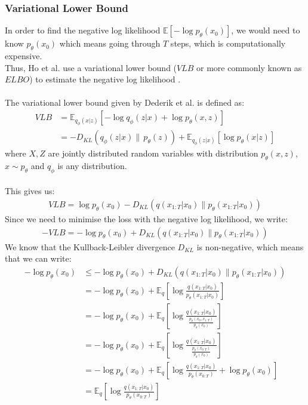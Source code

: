 \documentclass[twoside]{article}
\numberwithin{equation}{section}
\numberwithin{figure}{section}
\begin{document}
\subsubsection{Variational Lower Bound}
In order to find the negative log likelihood $\mathbb{E}\left[- \log p_{\theta} \left(x_0\right)\right]$, we would need to know $p_{\theta} (x_0)$ which means going through $T$ steps, which is computationally expensive. \\
Thus, Ho et al. \cite{ho2020denoising} use a variational lower bound ($VLB$ or more commonly known as $ELBO$) to estimate the negative log likelihood \cite{ho2020denoising,sohldickstein2015deep}.
\\\\
The variational lower bound given by Dederik et al. is defined as: \cite{kingma2022autoencoding} 
\begin{align}
  VLB &= \mathbb{E}_{q_\phi (x | z)} \left[ - \log q_\phi (z | x) + \log p_\theta(x, z) \right] \\[10pt]
  &= - D_{KL} (q_\phi (z | x) \| \, p_\theta (z)) + \mathbb{E}_{q_\phi (z | x)} \left[ \log p_\theta (x | z) \right]
\end{align}
where $X, Z$ are jointly distributed random variables with distribution $p_\theta (x, z)$, $x \sim p_\theta$ and $q_\phi$ is any distribution.
\\\\
This gives us:
\begin{gather}
  VLB = \log p_{\theta}\left(x_0\right) - D_{KL}\left(q\left(x_{1:T}|x_0\right) \| p_{\theta}\left(x_{1:T}|x_0\right)\right)
\end{gather}
Since we need to minimise the loss with the negative log likelihood, we write:
\begin{gather}
  - VLB = - \log p_{\theta}\left(x_0\right) + D_{KL}\left(q\left(x_{1:T}|x_0\right) \| p_{\theta}\left(x_{1:T}|x_0\right)\right)
\end{gather}
We know that the Kullback-Leibler divergence $D_{KL}$ is non-negative, which means that we can write:
\begin{align}
  - \log p_{\theta}\left(x_0\right) &\leq - \log p_{\theta}\left(x_0\right) + D_{KL}\left(q\left(x_{1:T}|x_0\right) \| p_{\theta}\left(x_{1:T}|x_0\right)\right) \\[10pt]
  &= - \log p_{\theta}\left(x_0\right) + \mathbb{E}_q \left[\log \frac{q\left(x_{1:T}|x_0\right)}{p_{\theta}\left(x_{1:T}|x_0\right)}\right] \\[10pt]
  &= - \log p_{\theta}\left(x_0\right) + \mathbb{E}_q \left[\log \frac{q\left(x_{1:T}|x_0\right)}{\frac{p_{\theta}\left(x_0, x_{1:T}\right)}{p_{\theta}\left(x_0\right)}}\right] \\[10pt]
  &= - \log p_{\theta}\left(x_0\right) + \mathbb{E}_q \left[\log \frac{q\left(x_{1:T}|x_0\right)}{\frac{p_{\theta}\left(x_{0:T}\right)}{p_{\theta}\left(x_0\right)}}\right] \\[10pt]
  &= - \log p_{\theta}\left(x_0\right) + \mathbb{E}_q \left[\log \frac{q\left(x_{1:T}|x_0\right)}{p_{\theta}\left(x_{0:T}\right)} + \log {p_{\theta}\left(x_0\right)}\right] \\[10pt]
  &= \mathbb{E}_q \left[\log \frac{q\left(x_{1:T}|x_0\right)}{p_{\theta}\left(x_{0:T}\right)}\right]
\end{align}
\end{document}
